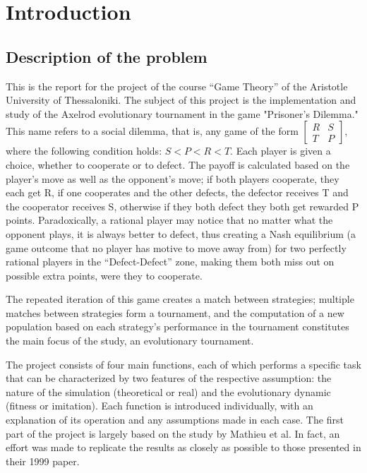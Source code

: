 \documentclass[12pt]{article}
\begin{document}
\tableofcontents %

\clearpage
\section{Introduction}
\subsection{Description of the problem}
This is the report for the project of the course ``Game Theory'' of the Aristotle University of Thessaloniki. The subject of this project is the implementation and study of the Axelrod evolutionary tournament in the game "Prisoner's Dilemma." This name refers to a social dilemma, that is, any game of the form $\begin{bmatrix} R & S \\ T & P \end{bmatrix}$, where the following condition holds: $S < P < R < T$. Each player is given a choice, whether to cooperate or to defect. The payoff is calculated based on the player's move as well as the opponent's move; if both players cooperate, they each get R, if one cooperates and the other defects, the defector receives T and the cooperator receives S, otherwise if they both defect they both get rewarded P points. Paradoxically, a rational player may notice that no matter what the opponent plays, it is always better to defect, thus creating a Nash equilibrium (a game outcome that no player has motive to move away from) for two perfectly rational players in the ``Defect-Defect'' zone, making them both miss out on possible extra points, were they to cooperate. 

The repeated iteration of this game creates a match between strategies; multiple matches between strategies form a tournament, and the computation of a new population based on each strategy’s performance in the tournament constitutes the main focus of the study, an evolutionary tournament.

The project consists of four main functions, each of which performs a specific task that can be characterized by two features of the respective assumption: the nature of the simulation (theoretical or real) and the evolutionary dynamic (fitness or imitation). Each function is introduced individually, with an explanation of its operation and any assumptions made in each case. The first part of the project is largely based on the study by Mathieu et al. In fact, an effort was made to replicate the results as closely as possible to those presented in their 1999 paper.
\end{document}
